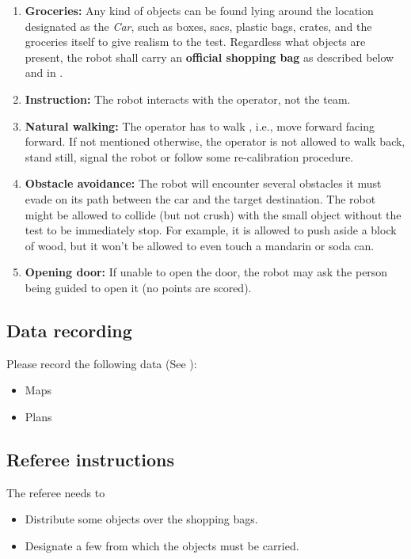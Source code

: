 \begin{enumerate}
  \item \textbf{Groceries:} Any kind of objects can be found lying around the location designated as the \textit{Car}, such as boxes, sacs, plastic bags, crates, and the groceries itself to give realism to the test. Regardless what objects are present, the robot shall carry an \textbf{official shopping bag} as described below and in .
  
  \item \textbf{Instruction:} The robot interacts with the operator, not the team.
  
  \item \textbf{Natural walking:} The operator has to walk , i.e., move forward facing forward. If not mentioned otherwise, the operator is not allowed to walk back, stand still, signal the robot or follow some re-calibration procedure.

  \item \textbf{Obstacle avoidance:} The robot will encounter several obstacles it must evade on its path between the car and the target destination.
  The robot might be allowed to collide (but not crush) with the small object without the test to be immediately stop. For example, it is allowed to push aside a block of wood, but it won't be allowed to even touch a mandarin or soda can.

  \item \textbf{Opening door:} If unable to open the door, the robot may ask the person being guided to open it (no points are scored).

\end{enumerate}

\subsection{Data recording}
  Please record the following data (See ):
\begin{itemize}
 \item Maps
 \item Plans
\end{itemize}

\subsection{Referee instructions}

The referee needs to
\begin{itemize}
  \item Distribute some objects over the shopping bags.
  \item Designate a few  from which the objects must be carried.
\end{itemize}

